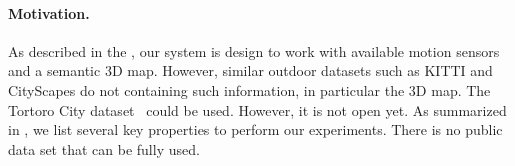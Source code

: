 \paragraph{Motivation.}
As described in the , our system is design to work with available motion sensors and a semantic 3D map.
However, similar outdoor datasets such as KITTI and CityScapes do not containing such information, in particular the 3D map. The Tortoro City dataset~\cite{wang2016torontocity} could be used. However, it is not open yet. As summarized in , we list several key properties to perform our experiments. There is no public data set that can be fully used. 

